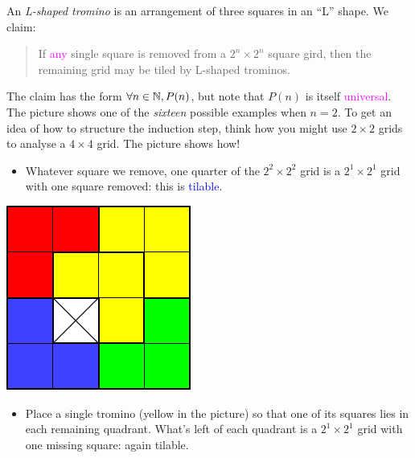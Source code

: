 \begin{example}{}{}
	An \emph{L-shaped tromino} is an arrangement of three squares in an ``L'' shape. We claim:\par
	\begin{minipage}[t]{0.75\linewidth}\vspace{-4pt}
		\begin{quote}
			If \textcolor{Magenta}{any} single square is removed from a $2^n\times 2^n$ square gird, then the remaining grid may be tiled by L-shaped trominos.
		\end{quote}
		\vspace{-6pt}
		The claim has the form $\forall n\in\mathbb{N},P(n)$, but note that $P(n)$ is itself \textcolor{Magenta}{universal}. The picture shows one of the \emph{sixteen} possible examples when $n=2$. To get an idea of how to structure the induction step, think how you might use $2\times 2$ grids to analyse a $4\times 4$ grid. The picture shows how!
		\begin{itemize}
		  \item Whatever square we remove, one quarter of the $2^2\times 2^2$ grid is a $2^1\times 2^1$ grid with one square removed: this is \textcolor{blue}{tilable}.
		\end{itemize}
	\end{minipage}
	\hfill
	\begin{minipage}[t]{0.24\linewidth}\vspace{0pt}
		\flushright\includegraphics{induction-11-tilingexample}
	\end{minipage}
	\par

\vspace{-2pt}
		
	\begin{itemize}
	 	\item Place a single tromino (yellow in the picture) so that one of its squares lies in each remaining quadrant. What's left of each quadrant is a $2^1\times 2^1$ grid with one missing square: again tilable.
	\end{itemize}
	

\end{example}
